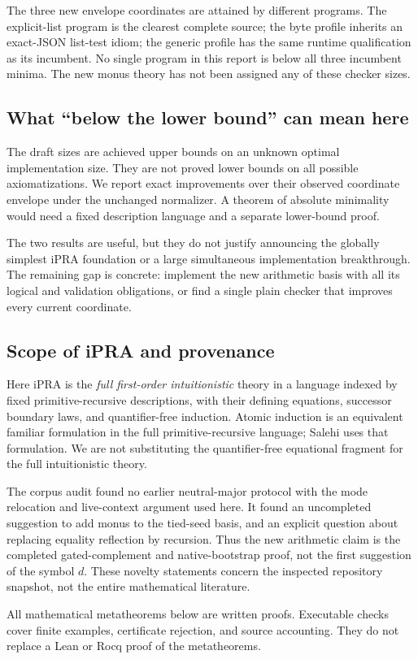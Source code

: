 

The three new envelope coordinates are attained by different programs.
The explicit-list program is the clearest complete source; the byte
profile inherits an exact-JSON list-test idiom; the generic profile has
the same runtime qualification as its incumbent. No single program in
this report is below all three incumbent minima. The new monus theory
has not been assigned any of these checker sizes.

\subsection{What ``below the lower bound'' can mean here}
The draft sizes are achieved upper bounds on an unknown optimal
implementation size. They are not proved lower bounds on all possible
axiomatizations. We report exact improvements over their observed
coordinate envelope under the unchanged normalizer. A theorem of
absolute minimality would need a fixed description language and a
separate lower-bound proof.

The two results are useful, but they do not justify announcing the
globally simplest iPRA foundation or a large simultaneous implementation
breakthrough. The remaining gap is concrete: implement the new arithmetic
basis with all its logical and validation obligations, or find a single
plain checker that improves every current coordinate.

\subsection{Scope of iPRA and provenance}
Here iPRA is the \emph{full first-order intuitionistic} theory in a
language indexed by fixed primitive-recursive descriptions, with their
defining equations, successor boundary laws, and quantifier-free
induction. Atomic induction is an equivalent familiar formulation in the
full primitive-recursive language; Salehi uses that formulation.\cite{salehi}
We are not substituting the quantifier-free equational fragment for the
full intuitionistic theory.

The corpus audit found no earlier neutral-major protocol with the mode
relocation and live-context argument used here. It found an uncompleted
suggestion to add monus to the tied-seed basis, and an explicit question
about replacing equality reflection by recursion. Thus the new arithmetic
claim is the completed gated-complement and native-bootstrap proof, not
the first suggestion of the symbol $d$. These novelty statements concern
the inspected repository snapshot, not the entire mathematical literature.

All mathematical metatheorems below are written proofs. Executable
checks cover finite examples, certificate rejection, and source
accounting. They do not replace a Lean or Rocq proof of the metatheorems.
